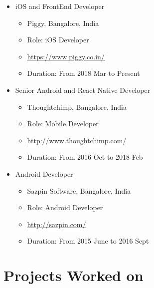 \documentclass[11pt,a4paper]{moderncv}
\begin{document}
    \begin{itemize}
        \item iOS and FrontEnd Developer
        \begin{itemize}
            \item Piggy, Bangalore, India
            \item Role: iOS Developer
            \item {\url{https://www.piggy.co.in/}}
            \item Duration: From 2018 Mar to Present 
        \end{itemize}
    \end{itemize}
    \begin{itemize}
        \item Senior Android and React Native Developer
        \begin{itemize}
            \item Thoughtchimp, Bangalore, India
            \item Role: Mobile Developer
            \item {\url{http://www.thoughtchimp.com/}}
            \item Duration: From 2016 Oct to 2018 Feb 
        \end{itemize}
    \end{itemize}
   \begin{itemize}
        \item Android Developer
        \begin{itemize}
            \item Sazpin Software, Bangalore, India
            \item Role: Android Developer  
            \item {\url{http://sazpin.com/}}
            \item Duration: From 2015 June to 2016 Sept
        \end{itemize}
    \end{itemize}
   
 
\section{Projects Worked on}

\end{document}
